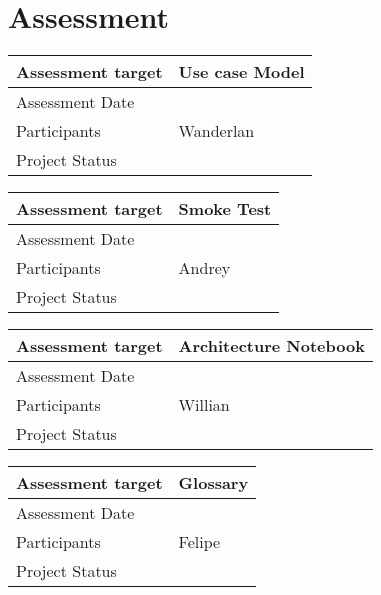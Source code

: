 \documentclass[a4paper,notitlepage]{article}%
\begin{document}
\section{Assessment}
%


\noindent\begin{tabular}{|l|l|}
\hline
Assessment target & Use case Model\\\hline
Assessment Date & \\\hline
Participants & Wanderlan \\\hline
Project Status & \\\hline
\end{tabular}

\noindent\begin{tabular}{|l|l|}
\hline
Assessment target & Smoke Test\\\hline
Assessment Date & \\\hline
Participants & Andrey \\\hline
Project Status & \\\hline
\end{tabular}

\noindent\begin{tabular}{|l|l|}
\hline
Assessment target & Architecture Notebook\\\hline
Assessment Date & \\\hline
Participants & Willian \\\hline
Project Status & \\\hline
\end{tabular}

\noindent\begin{tabular}{|l|l|}
\hline
Assessment target & Glossary\\\hline
Assessment Date & \\\hline
Participants & Felipe \\\hline
Project Status & \\\hline
\end{tabular}
\end{document}
